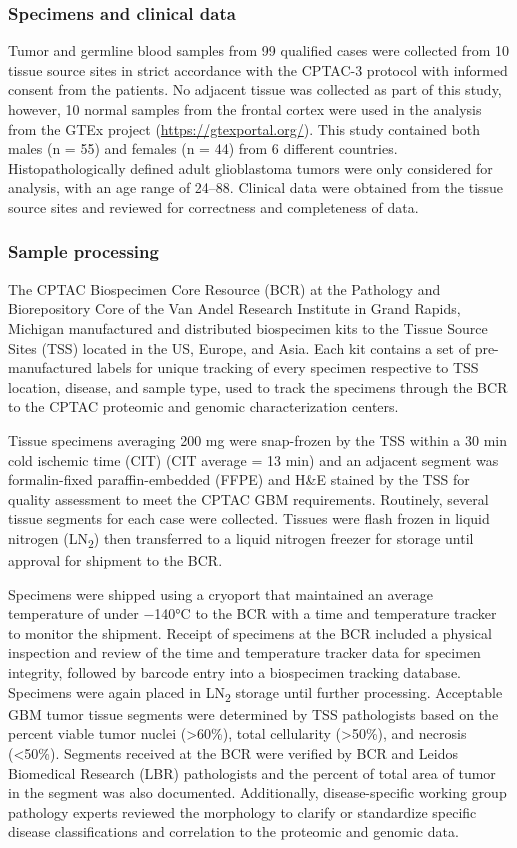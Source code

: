 \subsubsection{Specimens and clinical data}
Tumor and germline blood samples from 99 qualified cases were collected from 10 tissue source sites in strict accordance with the CPTAC-3 protocol with informed consent from the patients. No adjacent tissue was collected as part of this study, however, 10 normal samples from the frontal cortex were used in the analysis from the GTEx project (\url{https://gtexportal.org/}). This study contained both males (n = 55) and females (n = 44) from 6 different countries. Histopathologically defined adult glioblastoma tumors were only considered for analysis, with an age range of 24--88. Clinical data were obtained from the tissue source sites and reviewed for correctness and completeness of data.

\subsubsection{Sample processing}
The CPTAC Biospecimen Core Resource (BCR) at the Pathology and Biorepository Core of the Van Andel Research Institute in Grand Rapids, Michigan manufactured and distributed biospecimen kits to the Tissue Source Sites (TSS) located in the US, Europe, and Asia. Each kit contains a set of pre-manufactured labels for unique tracking of every specimen respective to TSS location, disease, and sample type, used to track the specimens through the BCR to the CPTAC proteomic and genomic characterization centers.

Tissue specimens averaging 200 mg were snap-frozen by the TSS within a 30 min cold ischemic time (CIT) (CIT average = 13 min) and an adjacent segment was formalin-fixed paraffin-embedded (FFPE) and H\&E stained by the TSS for quality assessment to meet the CPTAC GBM requirements. Routinely, several tissue segments for each case were collected. Tissues were flash frozen in liquid nitrogen (LN\textsubscript{2}) then transferred to a liquid nitrogen freezer for storage until approval for shipment to the BCR.

Specimens were shipped using a cryoport that maintained an average temperature of under −140°C to the BCR with a time and temperature tracker to monitor the shipment. Receipt of specimens at the BCR included a physical inspection and review of the time and temperature tracker data for specimen integrity, followed by barcode entry into a biospecimen tracking database. Specimens were again placed in LN\textsubscript{2} storage until further processing. Acceptable GBM tumor tissue segments were determined by TSS pathologists based on the percent viable tumor nuclei (>60\%), total cellularity (>50\%), and necrosis (<50\%). Segments received at the BCR were verified by BCR and Leidos Biomedical Research (LBR) pathologists and the percent of total area of tumor in the segment was also documented. Additionally, disease-specific working group pathology experts reviewed the morphology to clarify or standardize specific disease classifications and correlation to the proteomic and genomic data.

